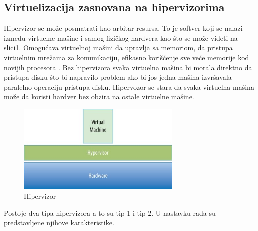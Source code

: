 \documentclass[12pt,oneside]{memoir}
\begin{document}
\subsection{Virtuelizacija zasnovana na hipervizorima}
Hipervizor se može posmatrati kao arbitar resursa. To je softver koji se nalazi između virtuelne mašine i samog fizičkog hardvera kao što se može videti na slici\ref{fig:hipervizor}. Omogućava virtuelnoj mašini da upravlja sa memoriom, da pristupa virtuelnim mrežama za komunikaciju, efikasno korišćenje sve veće memorije kod novijih procesora \cite{ve}. Bez hipervizora svaka virtuelna mašina bi morala direktno da pristupa disku što bi napravilo problem ako bi jos jedna mašina izvršavala paralelno operaciju pristupa disku. Hipervozor se stara da svaka virtuelna mašina može da koristi hardver bez obzira na ostale virtuelne mašine.
\begin{figure}[!ht]
  \centering
  \includegraphics[width=0.7\textwidth]{Slika 1.jpg}
  \caption{Hipervizor}
  \label{fig:hipervizor}
\end{figure}
 
Postoje dva tipa hipervizora a to su tip 1 i tip 2. U nastavku rada su predstavljene njihove karakteristike.
 
\end{document}

